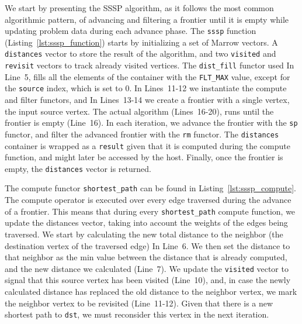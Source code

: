 We start by presenting the \gls{SSSP} algorithm, as it follows the most common algorithmic pattern, of advancing and filtering a frontier until it is empty while updating problem data during each advance phase. The \texttt{sssp} function (Listing~\ref{lst:sssp_function}) starts by initializing a set of Marrow vectors. A \texttt{distances} vector to store the result of the algorithm, and two \texttt{visited} and \texttt{revisit} vectors to track already visited vertices. The \texttt{dist\_fill} functor used In Line~5, fills all the elements of the container with the \texttt{FLT\_MAX} value, except for the \texttt{source} index, which is set to $0$. In Lines~11-12 we instantiate the compute and filter functors, and In Lines~13-14 we create a frontier with a single vertex, the input source vertex. The actual algorithm (Lines~16-20), runs until the frontier is empty (Line~16). In each iteration, we advance the frontier with the \texttt{sp} functor, and filter the advanced frontier with the \texttt{rm} functor. The \texttt{distances} container is wrapped as a \texttt{result} given that it is computed during the compute function, and might later be accessed by the host. Finally, once the frontier is empty, the \texttt{distances} vector is returned.





The compute functor \texttt{shortest\_path} can be found in Listing~\ref{lst:sssp_compute}. The compute operator is executed over every edge traversed during the advance of a frontier. This means that during every \texttt{shortest\_path} compute function, we update the distances vector, taking into account the weights of the edges being traversed. We start by calculating the new total distance to the neighbor (the destination vertex of the traversed edge) In Line~6. We then set the distance to that neighbor as the min value between the distance that is already computed, and the new distance we calculated (Line~7). We update the \texttt{visited} vector to signal that this source vertex has been visited (Line~10), and, in case the newly calculated distance has replaced the old distance to the neighbor vertex, we mark the neighbor vertex to be revisited (Line~11-12). Given that there is a new shortest path to \texttt{dst}, we must reconsider this vertex in the next iteration.





